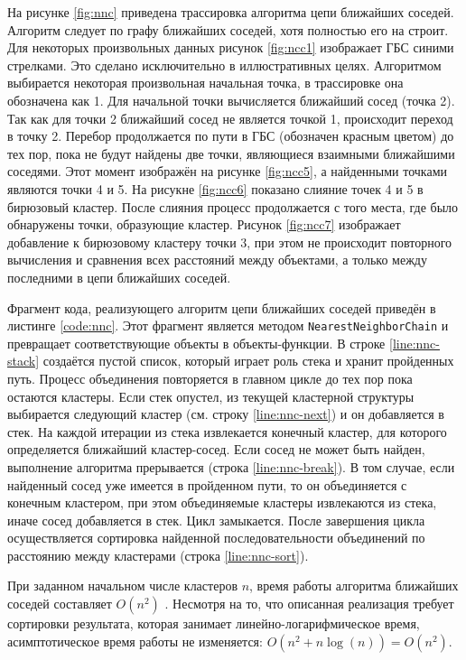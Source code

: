 \documentclass[12pt]{diploma}
\begin{document}
	На рисунке \ref{fig:nnc} приведена трассировка алгоритма цепи ближайших соседей. Алгоритм следует по графу ближайших соседей, хотя полностью его на строит. Для некоторых произвольных данных рисунок \ref{fig:ncc1} изображает ГБС синими стрелками. Это сделано исключительно в иллюстративных целях. Алгоритмом выбирается некоторая произвольная начальная точка, в трассировке она обозначена как 1. Для начальной точки вычисляется ближайший сосед (точка 2). Так как для точки 2 ближайший сосед не является точкой 1, происходит переход в точку 2. Перебор продолжается по пути в ГБС (обозначен красным цветом) до тех пор, пока не будут найдены две точки, являющиеся взаимными ближайшими соседями. Этот момент изображён на рисунке \ref{fig:ncc5}, а найденными точками являются точки 4 и 5. На рисукне \ref{fig:ncc6} показано слияние точек 4 и 5 в бирюзовый кластер. После слияния процесс продолжается с того места, где было обнаружены точки, образующие кластер. Рисунок \ref{fig:ncc7} изображает добавление к бирюзовому кластеру точки 3, при этом не происходит повторного вычисления и сравнения всех расстояний между объектами, а только между последними в цепи ближайших соседей.
			
		
	
	Фрагмент кода, реализующего алгоритм цепи ближайших соседей приведён в листинге \ref{code:nnc}. Этот фрагмент является методом \texttt{NearestNeighborChain} и превращает соответствующие объекты в объекты-функции. В строке \ref{line:nnc-stack} создаётся пустой список, который играет роль стека и хранит пройденных путь. Процесс объединения повторяется в главном цикле до тех пор пока остаются кластеры. Если стек опустел, из текущей кластерной структуры выбирается следующий кластер (см. строку \ref{line:nnc-next}) и он добавляется в стек. На каждой итерации из стека извлекается конечный кластер, для которого определяется ближайший кластер-сосед. Если сосед не может быть найден, выполнение алгоритма прерывается (строка \ref{line:nnc-break}). В том случае, если найденный сосед уже имеется в пройденном пути, то он объединяется с конечным кластером, при этом объединяемые кластеры извлекаются из стека, иначе сосед добавляется в стек. Цикл замыкается. После завершения цикла осуществляется сортировка найденной последовательности объединений по расстоянию между кластерами (строка \ref{line:nnc-sort}).
	
	При заданном начальном числе кластеров $ n $, время работы алгоритма ближайших соседей составляет $ O(n^2) $ \cite{nnc}. Несмотря на то, что описанная реализация требует сортировки результата, которая занимает линейно-логарифмическое время, асимптотическое время работы не изменяется: $ O(n^2+n \log(n))=O(n^2) $. 
	
\end{document}
